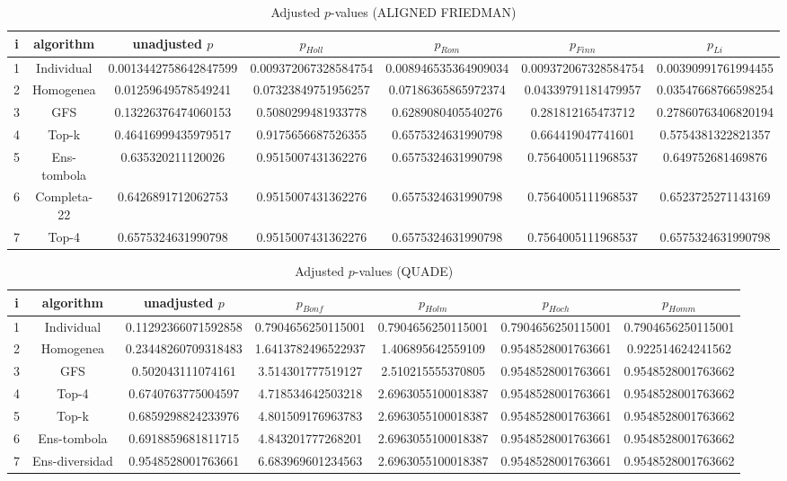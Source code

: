 \documentclass[a4paper,10pt]{article}
\begin{document}
\begin{landscape}
\begin{table}[!htp]
\centering\scriptsize
\caption{Adjusted $p$-values (ALIGNED FRIEDMAN)}
\begin{tabular}{ccccccc}
i&algorithm&unadjusted $p$&$p_{Holl}$&$p_{Rom}$&$p_{Finn}$&$p_{Li}$\\
\hline
1&Individual&0.0013442758642847599&0.009372067328584754&0.008946535364909034&0.009372067328584754&0.00390991761994455\\
2&Homogenea&0.01259649578549241&0.07323849751956257&0.07186365865972374&0.04339791181479957&0.03547668766598254\\
3&GFS&0.13226376474060153&0.5080299481933778&0.6289080405540276&0.281812165473712&0.27860763406820194\\
4&Top-k&0.46416999435979517&0.9175656687526355&0.6575324631990798&0.664419047741601&0.5754381322821357\\
5&Ens-tombola&0.635320211120026&0.9515007431362276&0.6575324631990798&0.7564005111968537&0.649752681469876\\
6&Completa-22&0.6426891712062753&0.9515007431362276&0.6575324631990798&0.7564005111968537&0.6523725271143169\\
7&Top-4&0.6575324631990798&0.9515007431362276&0.6575324631990798&0.7564005111968537&0.6575324631990798\\
\hline
\end{tabular}
\end{table}


\newpage

\begin{table}[!htp]
\centering\scriptsize
\caption{Adjusted $p$-values (QUADE)}
\begin{tabular}{ccccccc}
i&algorithm&unadjusted $p$&$p_{Bonf}$&$p_{Holm}$&$p_{Hoch}$&$p_{Homm}$\\
\hline
1&Individual&0.11292366071592858&0.7904656250115001&0.7904656250115001&0.7904656250115001&0.7904656250115001\\
2&Homogenea&0.23448260709318483&1.6413782496522937&1.406895642559109&0.9548528001763661&0.922514624241562\\
3&GFS&0.502043111074161&3.514301777519127&2.510215555370805&0.9548528001763661&0.9548528001763662\\
4&Top-4&0.6740763775004597&4.718534642503218&2.6963055100018387&0.9548528001763661&0.9548528001763662\\
5&Top-k&0.6859298824233976&4.801509176963783&2.6963055100018387&0.9548528001763661&0.9548528001763662\\
6&Ens-tombola&0.6918859681811715&4.843201777268201&2.6963055100018387&0.9548528001763661&0.9548528001763662\\
7&Ens-diversidad&0.9548528001763661&6.683969601234563&2.6963055100018387&0.9548528001763661&0.9548528001763662\\
\hline
\end{tabular}
\end{table}


\end{landscape}
\end{document}
